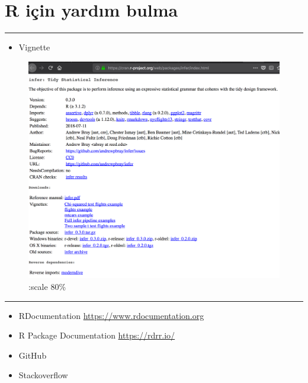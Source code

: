 \documentclass[]{article}
\providecommand{\tightlist}{%
  \setlength{\itemsep}{0pt}\setlength{\parskip}{0pt}}
\begin{document}
\hypertarget{r-icin-yardim-bulma}{%
\section{R için yardım bulma}\label{r-icin-yardim-bulma}}

\begin{center}\rule{0.5\linewidth}{\linethickness}\end{center}

\begin{itemize}
\tightlist
\item
  Vignette
\end{itemize}

\begin{figure}
\centering
\includegraphics{figures/vignette.png}
\caption{:scale 80\%}
\end{figure}

\begin{center}\rule{0.5\linewidth}{\linethickness}\end{center}

\begin{itemize}
\item
  RDocumentation \url{https://www.rdocumentation.org}
\item
  R Package Documentation \url{https://rdrr.io/}
\item
  GitHub
\item
  Stackoverflow
\end{itemize}
\end{document}
